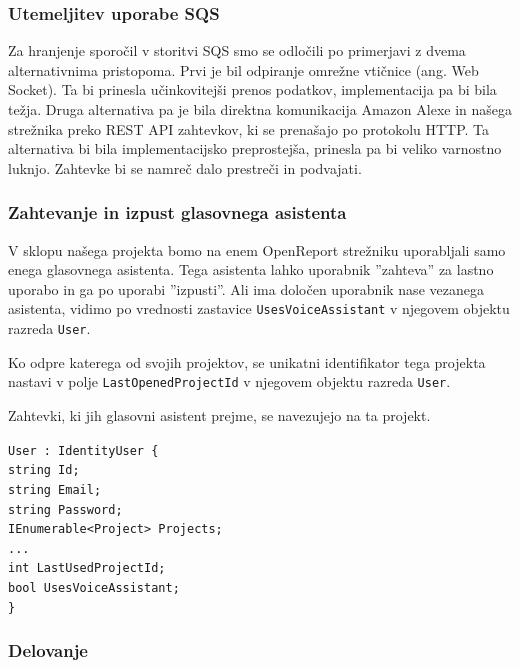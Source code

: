 \documentclass[a4paper, 12pt]{book}
\begin{document}
\subsubsection{Utemeljitev uporabe SQS}
Za hranjenje sporočil v storitvi SQS smo se odločili po primerjavi z dvema alternativnima pristopoma.
Prvi je bil odpiranje omrežne vtičnice (ang. Web Socket).
Ta bi prinesla učinkovitejši prenos podatkov, implementacija pa bi bila težja.
Druga alternativa pa je bila direktna komunikacija Amazon Alexe in našega strežnika preko REST API zahtevkov, ki se prenašajo po protokolu HTTP.
Ta alternativa bi bila implementacijsko preprostejša, prinesla pa bi veliko varnostno luknjo.
Zahtevke bi se namreč dalo prestreči in podvajati.

\subsubsection{Zahtevanje in izpust glasovnega asistenta}

V sklopu našega projekta bomo na enem OpenReport strežniku uporabljali samo enega glasovnega asistenta.
Tega asistenta lahko uporabnik ''zahteva'' za lastno uporabo in ga po uporabi ''izpusti''.
Ali ima določen uporabnik nase vezanega asistenta, vidimo po vrednosti zastavice \texttt{UsesVoiceAssistant} v njegovem objektu razreda \texttt{User}.

Ko odpre katerega od svojih projektov, se unikatni identifikator tega projekta nastavi v polje \texttt{LastOpenedProjectId} v njegovem objektu razreda \texttt{User}.

Zahtevki, ki jih glasovni asistent prejme, se navezujejo na ta projekt.

\noindent \texttt{User : IdentityUser \{ \\
string Id; \\
string Email; \\
string Password; \\
IEnumerable<Project> Projects; \\
... \\
int LastUsedProjectId; \\
bool UsesVoiceAssistant; \\
\}}

\subsubsection{Delovanje}
\end{document}
